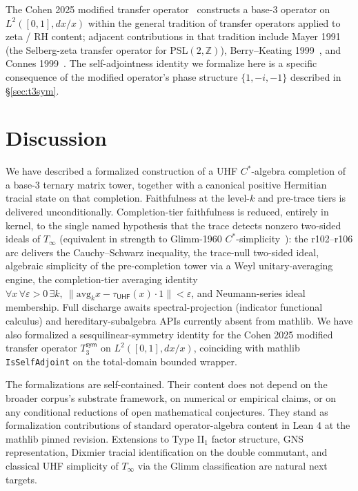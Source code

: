 \documentclass[11pt,a4paper]{amsart}
\theoremstyle{plain}
\theoremstyle{definition}
\begin{document}
The Cohen 2025 modified transfer operator~\cite{cohen2025transferOp} constructs a base-3 operator on $L^2([0,1], dx/x)$ within the general tradition of transfer operators applied to zeta / RH content; adjacent contributions in that tradition include Mayer 1991~\cite{mayer1991} (the Selberg-zeta transfer operator for PSL$(2, \mathbb{Z})$), Berry--Keating 1999~\cite{berry-keating1999}, and Connes 1999~\cite{connes1999}. The self-adjointness identity we formalize here is a specific consequence of the modified operator's phase structure $\{1, -i, -1\}$ described in \S\ref{sec:t3sym}.

\section{Discussion}\label{sec:discussion}

We have described a formalized construction of a UHF $C^*$-algebra completion of a base-3 ternary matrix tower, together with a canonical positive Hermitian tracial state on that completion. Faithfulness at the level-$k$ and pre-trace tiers is delivered unconditionally. Completion-tier faithfulness is reduced, entirely in kernel, to the single named hypothesis that the trace detects nonzero two-sided ideals of $T_\infty$ (equivalent in strength to Glimm-1960 $C^*$-simplicity~\cite{glimm1960}): the r102--r106 arc delivers the Cauchy--Schwarz inequality, the trace-null two-sided ideal, algebraic simplicity of the pre-completion tower via a Weyl unitary-averaging engine, the completion-tier averaging identity $\forall x\,\forall \varepsilon>0\,\exists k,\ \|\mathrm{avg}_k x - \tau_{\textsf{UHF}}(x)\cdot 1\|<\varepsilon$, and Neumann-series ideal membership. Full discharge awaits spectral-projection (indicator functional calculus) and hereditary-subalgebra APIs currently absent from mathlib. We have also formalized a sesquilinear-symmetry identity for the Cohen 2025 modified transfer operator $T_3^{\textsf{sym}}$ on $L^2([0,1], dx/x)$, coinciding with mathlib \texttt{IsSelfAdjoint} on the total-domain bounded wrapper.

The formalizations are self-contained. Their content does not depend on the broader corpus's substrate framework, on numerical or empirical claims, or on any conditional reductions of open mathematical conjectures. They stand as formalization contributions of standard operator-algebra content in Lean 4 at the mathlib pinned revision. Extensions to Type II$_1$ factor structure, GNS representation, Dixmier tracial identification on the double commutant, and classical UHF simplicity of $T_\infty$ via the Glimm classification are natural next targets.
\end{document}
